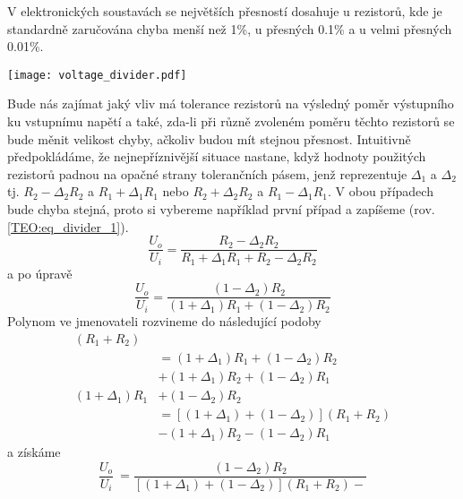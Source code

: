 \begin{example}\label{TEO:ex_CitDiveder01}
  V elektronických soustavách se největších přesností dosahuje u rezistorů, kde je standardně 
  zaručována chyba menší než 1\%, u přesných 0.1\% a u velmi přesných 0.01\%.

   {\centering
    \captionsetup{type=figure}
    \texttt{[image: voltage\_divider.pdf]}
    \label{TEO:fig_voltage_divider}
    \par}

  Bude nás zajímat jaký vliv má tolerance rezistorů na výsledný poměr výstupního ku vstupnímu 
  napětí a také, zda-li při různě zvoleném poměru těchto rezistorů se bude měnit velikost chyby, 
  ačkoliv budou mít stejnou přesnost. Intuitivně předpokládáme, že  nejnepříznivější situace  
  nastane, když hodnoty použitých rezistorů padnou na opačné strany tolerančních pásem, jenž 
  reprezentuje $\Delta_1$ a $\Delta_2$ tj. $R_2 - \Delta_2R_2$ a $R_1 + \Delta_1R_1$ nebo $R_2 + 
  \Delta_2R_2$ a $R_1 - \Delta_1R_1$. V obou případech bude chyba stejná, proto si vybereme 
  například první případ a zapíšeme (rov. \ref{TEO:eq_divider_1}).
  \begin{equation}\label{TEO:eq_divider_1}
    \frac{U_o}{U_i} = \frac{R_2-\Delta_2 R_2}{R_1+\Delta_1 R_1+R_2-\Delta_2 R_2}
  \end{equation}
  a po úpravě
  \begin{equation*}
     \frac{U_o}{U_i} = \frac{(1-\Delta_2) R_2}{(1+\Delta_1) R_1+(1-\Delta_2) R_2}
  \end{equation*}
  Polynom ve jmenovateli rozvineme do následující podoby
  \begin{align*}
     [(1+\Delta_1) &+ (1-\Delta_2)](R_1+R_2)                \\
                   &= (1+\Delta_1)R_1 + (1-\Delta_2)R_2     \\
                   &+ (1+\Delta_1)R_2 + (1-\Delta_2)R_1     \\
   (1+\Delta_1)R_1 &+ (1-\Delta_2)R_2                       \\
                   &= [(1+\Delta_1)+(1-\Delta_2)](R_1+R_2)  \\
                   &- (1+\Delta_1)R_2 - (1-\Delta_2)R_1 
  \end{align*}
  a získáme %
  {\footnotesize
  \begin{equation*}
      \dfrac{U_o}{U_i}\ =
        \dfrac{(1-\Delta_2) R_2}{[(1+\Delta_1) + (1-\Delta_2)](R_1+R_2) - 
}
\end{equation*}}
\end{example}
